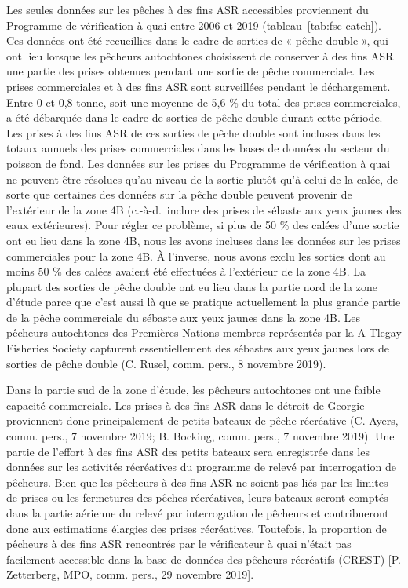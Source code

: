\documentclass[11pt]{book}
\begin{document}
Les seules données sur les pêches à des fins ASR accessibles proviennent du Programme de vérification à quai entre 2006 et 2019 (tableau~\ref{tab:fsc-catch}). Ces données ont été recueillies dans le cadre de sorties de « pêche double », qui ont lieu lorsque les pêcheurs autochtones choisissent de conserver à des fins ASR une partie des prises obtenues pendant une sortie de pêche commerciale. Les prises commerciales et à des fins ASR sont surveillées pendant le déchargement. Entre 0 et 0,8 tonne, soit une moyenne de 5,6 \% du total des prises commerciales, a été débarquée dans le cadre de sorties de pêche double durant cette période. Les prises à des fins ASR de ces sorties de pêche double sont incluses dans les totaux annuels des prises commerciales dans les bases de données du secteur du poisson de fond. Les données sur les prises du Programme de vérification à quai ne peuvent être résolues qu'au niveau de la sortie plutôt qu'à celui de la calée, de sorte que certaines des données sur la pêche double peuvent provenir de l'extérieur de la zone 4B (c.-à-d.~inclure des prises de sébaste aux yeux jaunes des eaux extérieures). Pour régler ce problème, si plus de 50 \% des calées d'une sortie ont eu lieu dans la zone 4B, nous les avons incluses dans les données sur les prises commerciales pour la zone 4B. À l'inverse, nous avons exclu les sorties dont au moins 50 \% des calées avaient été effectuées à l'extérieur de la zone 4B. La plupart des sorties de pêche double ont eu lieu dans la partie nord de la zone d'étude parce que c'est aussi là que se pratique actuellement la plus grande partie de la pêche commerciale du sébaste aux yeux jaunes dans la zone 4B. Les pêcheurs autochtones des Premières Nations membres représentés par la A-Tlegay Fisheries Society capturent essentiellement des sébastes aux yeux jaunes lors de sorties de pêche double (C. Rusel, comm. pers., 8 novembre 2019).

Dans la partie sud de la zone d'étude, les pêcheurs autochtones ont une faible capacité commerciale. Les prises à des fins ASR dans le détroit de Georgie proviennent donc principalement de petits bateaux de pêche récréative (C. Ayers, comm. pers., 7 novembre 2019; B. Bocking, comm. pers., 7 novembre 2019). Une partie de l'effort à des fins ASR des petits bateaux sera enregistrée dans les données sur les activités récréatives du programme de relevé par interrogation de pêcheurs. Bien que les pêcheurs à des fins ASR ne soient pas liés par les limites de prises ou les fermetures des pêches récréatives, leurs bateaux seront comptés dans la partie aérienne du relevé par interrogation de pêcheurs et contribueront donc aux estimations élargies des prises récréatives. Toutefois, la proportion de pêcheurs à des fins ASR rencontrés par le vérificateur à quai n'était pas facilement accessible dans la base de données des pêcheurs récréatifs (CREST) {[}P. Zetterberg, MPO, comm. pers., 29 novembre 2019{]}.
\end{document}
